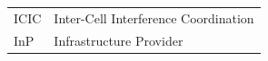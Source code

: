 \begin{tabular}{ll}
ICIC & Inter-Cell Interference Coordination\\
InP & Infrastructure Provider\\
%
%


\end{tabular}
